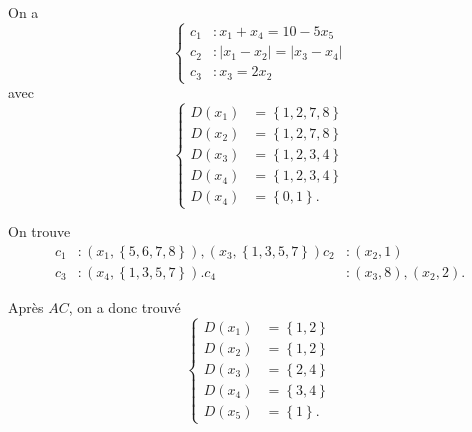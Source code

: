 \begin{td-exo}
    On a
    \begin{equation*}
        \begin{cases}
            c_1 &\colon x_1 + x_4 = 10 - 5x_5 \\
            c_2 &\colon |x_1 - x_2| = |x_3 - x_4| \\
            c_3 &\colon x_3 = 2x_2
        \end{cases}
    \end{equation*}
    avec
    \begin{equation*}
        \begin{cases}
            D(x_1) &= \left\{1, 2, 7,  8\right\} \\
            D(x_2) &= \left\{1, 2, 7,  8\right\} \\
            D(x_3) &= \left\{1, 2, 3, 4\right\} \\
            D(x_4) &= \left\{1, 2, 3, 4\right\} \\
            D(x_4) &= \left\{0, 1\right\}.
        \end{cases}
    \end{equation*}

    On trouve
    \begin{equation*}
        \begin{aligned}
            c_1 &\colon (x_1, \left\{5, 6, 7, 8\right\}), (x_3, \left\{1, 3, 5, 7\right\})
            c_2 &\colon (x_2, 1) \\
            c_3 &\colon (x_4, \left\{1, 3, 5, 7\right\}).
            c_4 &\colon (x_3, 8), (x_2, 2).
        \end{aligned}
    \end{equation*}

    Après \(AC\), on a donc trouvé
    \begin{equation*}
        \begin{cases}
            D(x_1) &= \left\{1, 2\right\} \\
            D(x_2) &= \left\{1, 2\right\} \\
            D(x_3) &= \left\{2, 4\right\} \\
            D(x_4) &= \left\{3, 4\right\} \\
            D(x_5) &= \left\{1\right\}.
        \end{cases}
    \end{equation*}
\end{td-exo}